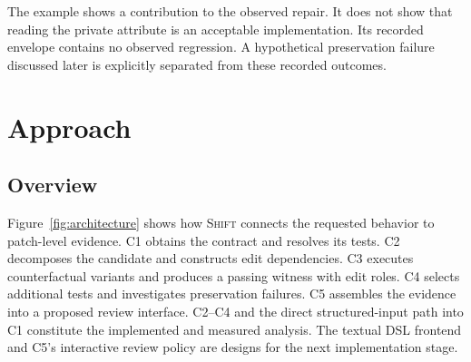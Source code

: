 \documentclass[a4paper,fleqn]{cas-sc}
\newcommand{\tool}{\textsc{Shift}}
\newcommand{\code}[1]{\texttt{\detokenize{#1}}}
\begin{document}
The example shows a contribution to the observed repair. It does not show that reading the private attribute \code{_wrapped} is an acceptable implementation. Its recorded envelope contains no observed regression. A hypothetical preservation failure discussed later is explicitly separated from these recorded outcomes.

\section{Approach}\label{sec:approach}

\subsection{Overview}\label{sec:overview}

Figure~\ref{fig:architecture} shows how \tool{} connects the requested behavior to patch-level evidence. C1 obtains the contract and resolves its tests. C2 decomposes the candidate and constructs edit dependencies. C3 executes counterfactual variants and produces a passing witness with edit roles. C4 selects additional tests and investigates preservation failures. C5 assembles the evidence into a proposed review interface. C2--C4 and the direct structured-input path into C1 constitute the implemented and measured analysis. The textual DSL frontend and C5's interactive review policy are designs for the next implementation stage.
\end{document}
